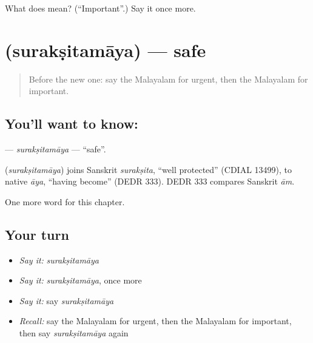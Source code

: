 \begin{tcolorbox}[breakable,colback=teal!4,colframe=teal!35!black,title={Before you move on}]
What does  mean? (\textquotedblleft{}Important\textquotedblright{}.) Say it once more.
\end{tcolorbox}
\section[\texorpdfstring{\ml{സുരക്ഷിതമായ} (surakṣitamāya)}{സുരക്ഷിതമായ (surakṣitamāya)}]{ (surakṣitamāya) — safe}

\label{lesson:ML-C283-suraksitamaya}



\begin{quote}
Before the new one: say the Malayalam for urgent, then the Malayalam for important.
\end{quote}

\subsection*{You'll want to know: }
\textbf{} — \emph{surakṣitamāya} — \textquotedblleft{}safe\textquotedblright{}.

\begin{cousinweb}
\textbf{} (\emph{surakṣitamāya}) joins Sanskrit \emph{surakṣita}, \textquotedblleft{}well protected\textquotedblright{} (CDIAL 13499), to native \emph{āya}, \textquotedblleft{}having become\textquotedblright{} (DEDR 333). DEDR 333 compares Sanskrit \emph{ām}.
\end{cousinweb}

\begin{grammarlens}[title={What you've built}]
One more word for this chapter.
\end{grammarlens}

\subsection*{Your turn}
\begin{itemize}
\raggedright
  \item \emph{Say it:} \emph{surakṣitamāya}
  \item \emph{Say it:} \emph{surakṣitamāya}, once more
  \item \emph{Say it:} say \emph{surakṣitamāya}
  \item \emph{Recall:} say the Malayalam for urgent, then the Malayalam for important, then say \emph{surakṣitamāya} again
\end{itemize}

